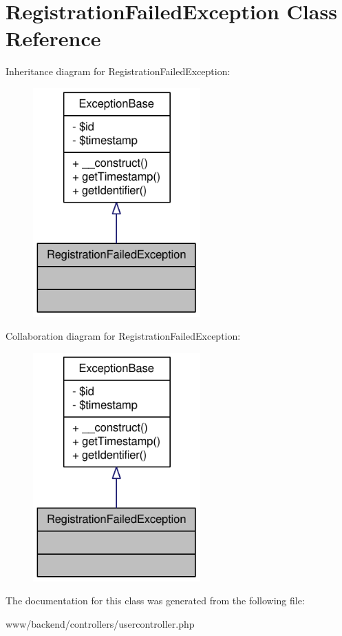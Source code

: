 \hypertarget{classRegistrationFailedException}{
\section{RegistrationFailedException Class Reference}
\label{classRegistrationFailedException}
}


Inheritance diagram for RegistrationFailedException:\nopagebreak
\begin{figure}[H]
\begin{center}
\leavevmode
\includegraphics[width=182pt]{classRegistrationFailedException__inherit__graph}
\end{center}
\end{figure}


Collaboration diagram for RegistrationFailedException:\nopagebreak
\begin{figure}[H]
\begin{center}
\leavevmode
\includegraphics[width=182pt]{classRegistrationFailedException__coll__graph}
\end{center}
\end{figure}


The documentation for this class was generated from the following file:\begin{DoxyCompactItemize}
\item 
www/backend/controllers/usercontroller.php\end{DoxyCompactItemize}
